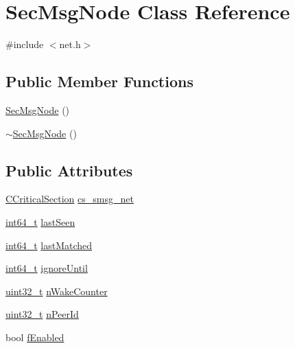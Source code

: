 \hypertarget{class_sec_msg_node}{}\section{Sec\+Msg\+Node Class Reference}
\label{class_sec_msg_node}


{\ttfamily \#include $<$net.\+h$>$}

\subsection*{Public Member Functions}
\begin{DoxyCompactItemize}
\item 
\hyperlink{class_sec_msg_node_aa8202b34054a4dc8bb54178957c3c263}{Sec\+Msg\+Node} ()
\item 
\hyperlink{class_sec_msg_node_a4a8079ab19804b88e7777d8940d13c0d}{$\sim$\+Sec\+Msg\+Node} ()
\end{DoxyCompactItemize}
\subsection*{Public Attributes}
\begin{DoxyCompactItemize}
\item 
\hyperlink{sync_8h_a37a4692b2d517f2843655ca11af7668a}{C\+Critical\+Section} \hyperlink{class_sec_msg_node_a202af59c01df20a0c45e2ff068df544d}{cs\+\_\+smsg\+\_\+net}
\item 
\hyperlink{stdint_8h_adec1df1b8b51cb32b77e5b86fff46471}{int64\+\_\+t} \hyperlink{class_sec_msg_node_a3a2e08f929788ebfb517218788e29836}{last\+Seen}
\item 
\hyperlink{stdint_8h_adec1df1b8b51cb32b77e5b86fff46471}{int64\+\_\+t} \hyperlink{class_sec_msg_node_ac714be60c0566e644df2e0eb006a7817}{last\+Matched}
\item 
\hyperlink{stdint_8h_adec1df1b8b51cb32b77e5b86fff46471}{int64\+\_\+t} \hyperlink{class_sec_msg_node_a574e453a229ed2cbed30ca56727fa564}{ignore\+Until}
\item 
\hyperlink{stdint_8h_a435d1572bf3f880d55459d9805097f62}{uint32\+\_\+t} \hyperlink{class_sec_msg_node_a72aad5e6551e9c79fac326a2a2806844}{n\+Wake\+Counter}
\item 
\hyperlink{stdint_8h_a435d1572bf3f880d55459d9805097f62}{uint32\+\_\+t} \hyperlink{class_sec_msg_node_a325228e72957728b80d299001e831480}{n\+Peer\+Id}
\item 
bool \hyperlink{class_sec_msg_node_ad6b7ce67b38267e49c7f173855258800}{f\+Enabled}
\end{DoxyCompactItemize}


